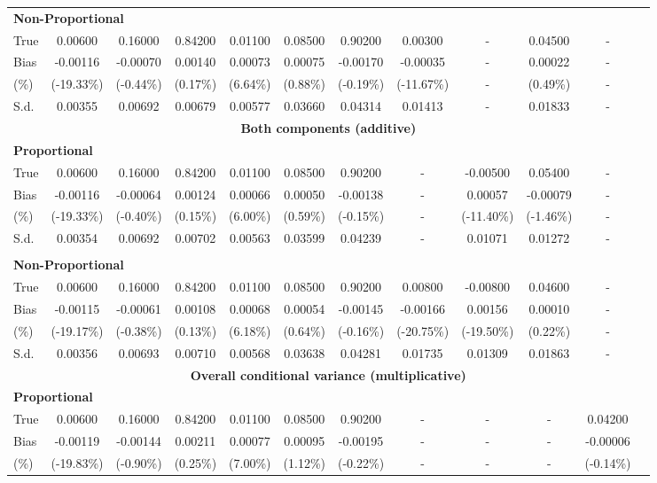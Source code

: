 \documentclass{article}
\begin{document}
\begin{table}
\begin{tabular}{lccccccccccc}
\multicolumn{12}{l}{\textbf{Non-Proportional}}\\
True & 0.00600 & 0.16000 & 0.84200 & 0.01100 & 0.08500& 0.90200 & 0.00300 & - & 0.04500 & -\\
Bias & -0.00116 & -0.00070 & 0.00140 & 0.00073 & 0.00075 & -0.00170 & -0.00035 & - & 0.00022 & -\\
(\%) & (-19.33\%) & (-0.44\%) & (0.17\%) & (6.64\%) & (0.88\%) & (-0.19\%) & (-11.67\%) & - & (0.49\%) & -\\
S.d. & 0.00355 & 0.00692 & 0.00679 & 0.00577 & 0.03660 & 0.04314 & 0.01413 & - & 0.01833 & -\\
\midrule
\multicolumn{12}{c}{\textbf{Both components (additive)}}\\
\multicolumn{12}{l}{\textbf{Proportional}}\\
True & 0.00600 & 0.16000 & 0.84200 & 0.01100 & 0.08500 & 0.90200 & - & -0.00500 & 0.05400 & -\\
Bias & -0.00116 & -0.00064 & 0.00124 & 0.00066 & 0.00050 & -0.00138 & - & 0.00057 & -0.00079 & -\\
(\%) & (-19.33\%) & (-0.40\%) & (0.15\%) & (6.00\%) & (0.59\%) & (-0.15\%) & - & (-11.40\%) & (-1.46\%) & -\\
S.d. & 0.00354 & 0.00692 & 0.00702 & 0.00563 & 0.03599 & 0.04239 & - & 0.01071 & 0.01272 & -\\
\mbox{}\\
\multicolumn{12}{l}{\textbf{Non-Proportional}}\\
True & 0.00600 & 0.16000 & 0.84200 & 0.01100 & 0.08500 & 0.90200 & 0.00800 & -0.00800 & 0.04600 & -\\
Bias & -0.00115 & -0.00061 & 0.00108 & 0.00068 & 0.00054 & -0.00145 & -0.00166 & 0.00156 & 0.00010 & -\\
(\%) & (-19.17\%) & (-0.38\%) & (0.13\%) & (6.18\%) & (0.64\%) & (-0.16\%) & (-20.75\%) & (-19.50\%) & (0.22\%) & -\\
S.d. & 0.00356 & 0.00693 & 0.00710 & 0.00568 & 0.03638 & 0.04281 & 0.01735 & 0.01309 & 0.01863 & -\\
\midrule
\multicolumn{12}{c}{\textbf{Overall conditional variance (multiplicative)}}\\
\multicolumn{12}{l}{\textbf{Proportional}}\\
True & 0.00600 & 0.16000 & 0.84200 & 0.01100 & 0.08500 & 0.90200 & - & - & - & 0.04200\\
Bias & -0.00119 & -0.00144 & 0.00211 & 0.00077 & 0.00095 & -0.00195 & - & - & - & -0.00006\\
(\%) & (-19.83\%) & (-0.90\%) & (0.25\%) & (7.00\%) & (1.12\%) & (-0.22\%) & - & - & - & (-0.14\%)\\

\end{tabular}
\end{table}
\end{document}
